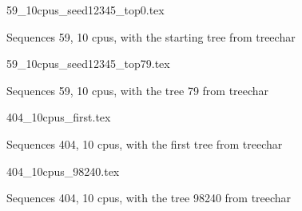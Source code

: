 \documentclass[12pt,a4paper]{article}
\begin{document}
\begin{figure}
\caption*{Sequences 59, 10 cpus, with the starting tree from treechar}
{59_10cpus_seed12345_top0.tex}
\end{figure}
 
\begin{figure}
\caption*{Sequences 59, 10 cpus, with the tree 79 from treechar}
{59_10cpus_seed12345_top79.tex}
\end{figure}


 
\begin{figure}
\caption*{Sequences 404, 10 cpus, with the first tree from treechar}
{404_10cpus_first.tex}
\end{figure}

 
\begin{figure}
\caption*{Sequences 404, 10 cpus, with the tree 98240 from treechar}
{404_10cpus_98240.tex}
\end{figure}
\end{document}
